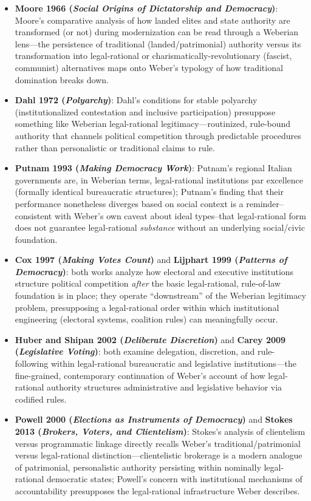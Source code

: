 \documentclass[12pt]{article}
\begin{document}
\begin{itemize}[leftmargin=*, itemsep=4pt]
    \item \textbf{Moore 1966 (\textit{Social Origins of Dictatorship and Democracy})}: Moore's comparative analysis of how landed elites and state authority are transformed (or not) during modernization can be read through a Weberian lens---the persistence of traditional (landed/patrimonial) authority versus its transformation into legal-rational or charismatically-revolutionary (fascist, communist) alternatives maps onto Weber's typology of how traditional domination breaks down.
    \item \textbf{Dahl 1972 (\textit{Polyarchy})}: Dahl's conditions for stable polyarchy (institutionalized contestation and inclusive participation) presuppose something like Weberian legal-rational legitimacy---routinized, rule-bound authority that channels political competition through predictable procedures rather than personalistic or traditional claims to rule.
    \item \textbf{Putnam 1993 (\textit{Making Democracy Work})}: Putnam's regional Italian governments are, in Weberian terms, legal-rational institutions par excellence (formally identical bureaucratic structures); Putnam's finding that their performance nonetheless diverges based on social context is a reminder--consistent with Weber's own caveat about ideal types--that legal-rational form does not guarantee legal-rational \emph{substance} without an underlying social/civic foundation.
    \item \textbf{Cox 1997 (\textit{Making Votes Count})} and \textbf{Lijphart 1999 (\textit{Patterns of Democracy})}: both works analyze how electoral and executive institutions structure political competition \emph{after} the basic legal-rational, rule-of-law foundation is in place; they operate ``downstream'' of the Weberian legitimacy problem, presupposing a legal-rational order within which institutional engineering (electoral systems, coalition rules) can meaningfully occur.
    \item \textbf{Huber and Shipan 2002 (\textit{Deliberate Discretion})} and \textbf{Carey 2009 (\textit{Legislative Voting})}: both examine delegation, discretion, and rule-following within legal-rational bureaucratic and legislative institutions---the fine-grained, contemporary continuation of Weber's account of how legal-rational authority structures administrative and legislative behavior via codified rules.
    \item \textbf{Powell 2000 (\textit{Elections as Instruments of Democracy})} and \textbf{Stokes 2013 (\textit{Brokers, Voters, and Clientelism})}: Stokes's analysis of clientelism versus programmatic linkage directly recalls Weber's traditional/patrimonial versus legal-rational distinction---clientelistic brokerage is a modern analogue of patrimonial, personalistic authority persisting within nominally legal-rational democratic states; Powell's concern with institutional mechanisms of accountability presupposes the legal-rational infrastructure Weber describes.

\end{itemize}
\end{document}

